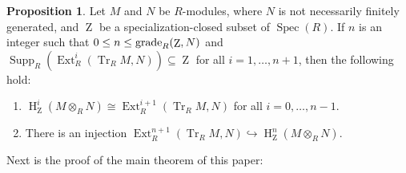 \documentclass[11pt]{amsart}
\theoremstyle{definition}
\newtheorem{prop}[thm]{Proposition}
\theoremstyle{definition}
\numberwithin{equation}{section}
\DeclareMathOperator{\gr}{\textnormal{grade}}
\DeclareMathOperator{\Tr}{Tr}
\DeclareMathOperator{\mz}{Z}
\DeclareMathOperator{\Ext}{Ext}
\DeclareMathOperator{\hh}{H}
\DeclareMathOperator{\Supp}{Supp}
\DeclareMathOperator{\Spec}{Spec}
\begin{document}
\begin{prop}\label{l2} Let $M$ and $N$ be $R$-modules, where $N$ is not necessarily finitely generated, and $\mz$ be a specialization-closed subset of $\Spec(R)$. If $n$ is an integer such that $0\leq n\leq\gr_R(\mz,N)$ and $\Supp_R\left(\Ext^i_R(\Tr_R M,N)\right)\subseteq\mz$ for all $i=1, \ldots, n+1$, then the following hold:
\begin{enumerate}[\rm(i)]
\item $\hh^{i}_{\mz}(M\otimes_RN)\cong\Ext^{i+1}_R(\Tr_R M,N)$ for all $i=0, \ldots, n-1$.
\item There is an injection $\Ext^{n+1}_R(\Tr_R M,N)\hookrightarrow\hh^{n}_{\mz}(M\otimes_RN)$. 
\end{enumerate}
\end{prop}

Next is the proof of the main theorem of this paper:
\end{document}
